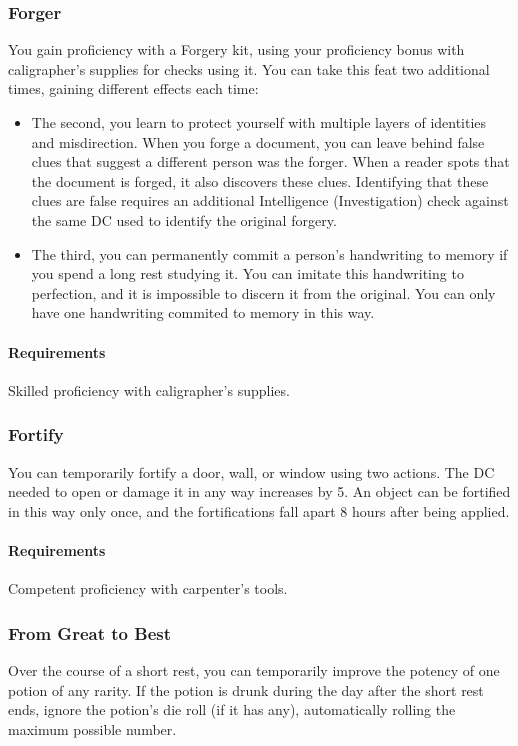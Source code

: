 \subsubsection{Forger} \label{feat::forger}
    You gain proficiency with a Forgery kit, using your proficiency bonus with caligrapher's supplies for checks using it.
    You can take this feat two additional times, gaining different effects each time:
    \begin{itemize}
        \item The second, you learn to protect yourself with multiple layers of identities and misdirection.
        When you forge a document, you can leave behind false clues that suggest a different person was the forger.
        When a reader spots that the document is forged, it also discovers these clues.
        Identifying that these clues are false requires an additional Intelligence (Investigation) check against the same DC used to identify the original forgery.
        \item The third, you can permanently commit a person's handwriting to memory if you spend a long rest studying it.
        You can imitate this handwriting to perfection, and it is impossible to discern it from the original.
        You can only have one handwriting commited to memory in this way.
    \end{itemize}
    \paragraph{Requirements} Skilled proficiency with caligrapher's supplies.
\subsubsection{Fortify} \label{feat::fortify}
    You can temporarily fortify a door, wall, or window using two actions.
    The DC needed to open or damage it in any way increases by 5.
    An object can be fortified in this way only once, and the fortifications fall apart 8 hours after being applied.
    \paragraph{Requirements} Competent proficiency with carpenter's tools.
\subsubsection{From Great to Best} \label{feat::fromgreattobest}
    Over the course of a short rest, you can temporarily improve the potency of one potion of any rarity.
    If the potion is drunk during the day after the short rest ends, ignore the potion's die roll (if it has any), automatically rolling the maximum possible number.

